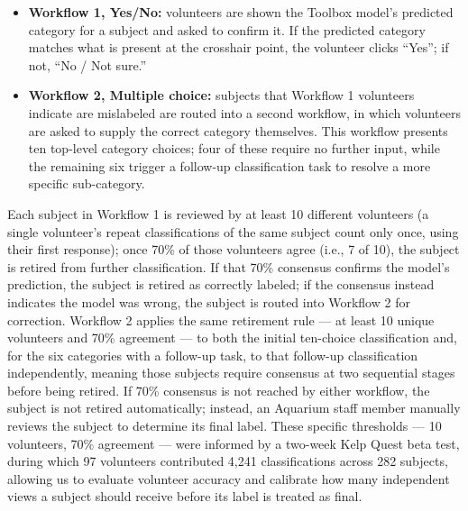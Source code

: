 \documentclass[11pt]{article}
\begin{document}
\begin{itemize}
\item 
\textbf{Workflow 1, Yes/No:} volunteers are shown the Toolbox model's 
predicted category for a subject and asked to confirm it. 
If the predicted category matches what is present at the crosshair point, the 
volunteer clicks ``Yes''; if not, ``No / Not sure.''
\item 
\textbf{Workflow 2, Multiple choice:} subjects that Workflow 1 volunteers 
indicate are mislabeled are routed into a second workflow, in which volunteers 
are asked to supply the correct category themselves. 
This workflow presents ten top-level category choices; four of these require no 
further input, while the remaining six trigger a follow-up classification 
task to resolve a more specific sub-category.
\end{itemize}

Each subject in Workflow 1 is reviewed by at least 10 different volunteers (a 
single volunteer's repeat classifications of the same subject count only once, 
using their first response); once 70\% of those volunteers agree (i.e., 7 of 
10), the subject is retired from further classification.
If that 70\% consensus confirms the model's prediction, the subject is retired 
as correctly labeled; if the consensus instead indicates the model was wrong, 
the subject is routed into Workflow 2 for correction.
Workflow 2 applies the same retirement rule --- at least 10 unique volunteers 
and 70\% agreement --- to both the initial ten-choice classification and, for 
the six categories with a follow-up task, to that follow-up classification 
independently, meaning those subjects require consensus at two sequential 
stages before being retired.
If 70\% consensus is not reached by either workflow, the subject is not retired 
automatically; instead, an Aquarium staff member manually reviews the subject 
to determine its final label.
These specific thresholds --- 10 volunteers, 70\% agreement --- were informed 
by a two-week Kelp Quest beta test, during which 97 volunteers contributed 
4{,}241 classifications across 282 subjects, allowing us to evaluate volunteer 
accuracy and calibrate how many independent views a subject should receive 
before its label is treated as final.
\end{document}
